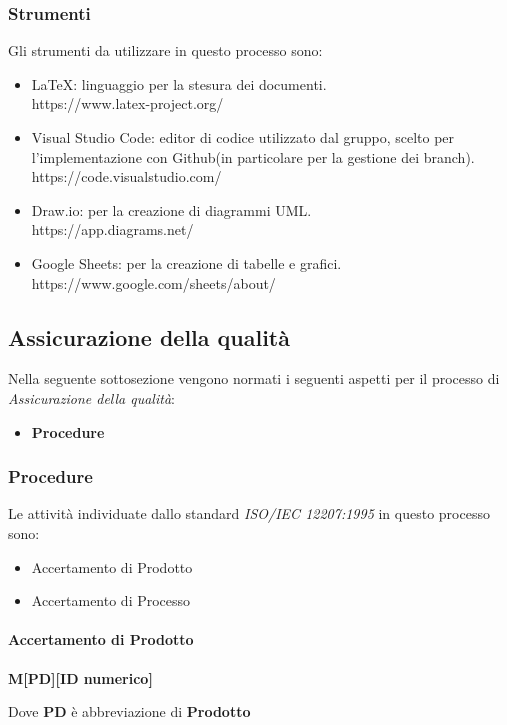 \setlength\extrarowheight{0pt}
\subsubsection{Strumenti}
Gli strumenti da utilizzare in questo processo sono:
\begin{itemize}
    \item LaTeX: linguaggio per la stesura dei documenti.\\
    https://www.latex-project.org/
    \item Visual Studio Code: editor di codice utilizzato dal gruppo, scelto per l'implementazione con Github(in particolare
    per la gestione dei branch).\\
    https://code.visualstudio.com/
    \item Draw.io: per la creazione di diagrammi UML.\\
    https://app.diagrams.net/
    \item Google Sheets: per la creazione di tabelle e grafici.\\
    https://www.google.com/sheets/about/
\end{itemize}

\subsection{Assicurazione della qualità}
Nella seguente sottosezione vengono normati i seguenti aspetti per il 
processo di \textit{Assicurazione della qualità}:
\begin{itemize}
    \item \textbf{Procedure}
\end{itemize}

\subsubsection{Procedure}
Le attività individuate dallo standard \textit{ISO/IEC 12207:1995} in questo processo sono:
\begin{itemize}
    \item Accertamento di Prodotto
    \item Accertamento di Processo
\end{itemize}

\paragraph{Accertamento di Prodotto}
\begin{center}
    \textbf{M[PD][ID numerico]}
\end{center}
Dove \textbf{PD} è abbreviazione di \textbf{Prodotto}

